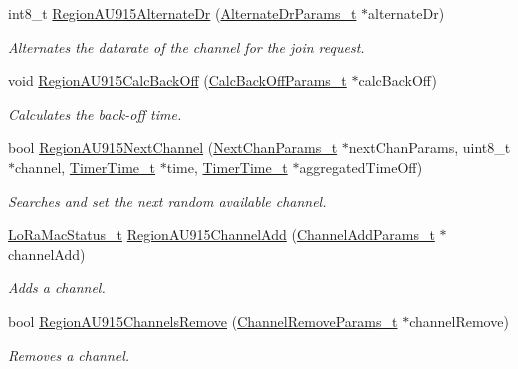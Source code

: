 \begin{DoxyCompactItemize}
int8\+\_\+t \hyperlink{group__REGIONAU915_ga968233f3d01f5aa9f91fff2c20955616}{Region\+A\+U915\+Alternate\+Dr} (\hyperlink{group__REGION_ga001ea4338d1c83f4c785b49d7ad2d696}{Alternate\+Dr\+Params\+\_\+t} $\ast$alternate\+Dr)
\begin{DoxyCompactList}\small\item\em Alternates the datarate of the channel for the join request. \end{DoxyCompactList}\item 
void \hyperlink{group__REGIONAU915_gaa3847b5ebad54c613afd3b823f1c39e9}{Region\+A\+U915\+Calc\+Back\+Off} (\hyperlink{group__REGION_ga7c5c9a8da174e6679eded8257dc92fd9}{Calc\+Back\+Off\+Params\+\_\+t} $\ast$calc\+Back\+Off)
\begin{DoxyCompactList}\small\item\em Calculates the back-\/off time. \end{DoxyCompactList}\item 
bool \hyperlink{group__REGIONAU915_gaa729787fd4ca5a83011f6928c278f95f}{Region\+A\+U915\+Next\+Channel} (\hyperlink{group__REGION_ga115f5e83afae352c0a3dcdc193374040}{Next\+Chan\+Params\+\_\+t} $\ast$next\+Chan\+Params, uint8\+\_\+t $\ast$channel, \hyperlink{utilities_8h_a4215ca43d3e953099ea758ce428599d0}{Timer\+Time\+\_\+t} $\ast$time, \hyperlink{utilities_8h_a4215ca43d3e953099ea758ce428599d0}{Timer\+Time\+\_\+t} $\ast$aggregated\+Time\+Off)
\begin{DoxyCompactList}\small\item\em Searches and set the next random available channel. \end{DoxyCompactList}\item 
\hyperlink{group__LORAMAC_ga30bd25657e10480f8605ee951b0ecfbd}{Lo\+Ra\+Mac\+Status\+\_\+t} \hyperlink{group__REGIONAU915_ga1065da4a50172d3af558c7bacc28ad10}{Region\+A\+U915\+Channel\+Add} (\hyperlink{group__REGION_gab1c5f3aa06614283202906cef4417860}{Channel\+Add\+Params\+\_\+t} $\ast$channel\+Add)
\begin{DoxyCompactList}\small\item\em Adds a channel. \end{DoxyCompactList}\item 
bool \hyperlink{group__REGIONAU915_ga4dfd376f684a40c659c69bf127a71a71}{Region\+A\+U915\+Channels\+Remove} (\hyperlink{group__REGION_gaa37468560d2fc81a977b57a48e5d72c0}{Channel\+Remove\+Params\+\_\+t} $\ast$channel\+Remove)
\begin{DoxyCompactList}\small\item\em Removes a channel. \end{DoxyCompactList}\item 

\end{DoxyCompactItemize}
